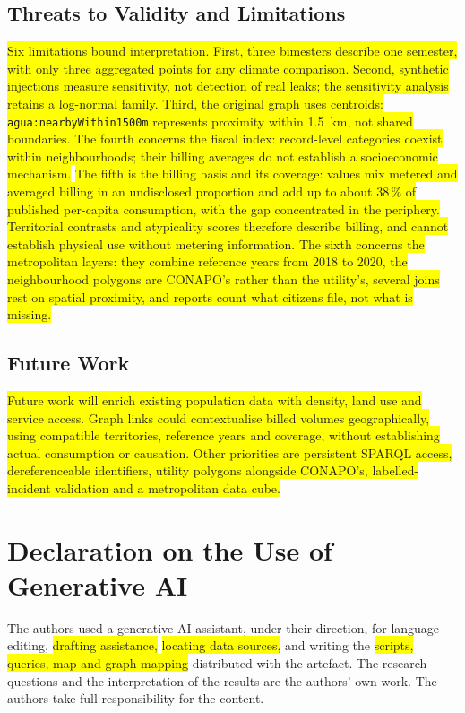 \documentclass[runningheads]{llncs}
\newif\ifmarcarcambios
\newenvironment{icokgblock}{\ifmarcarcambios\color{nuevo}\fi}{}
\newcommand{\nuevo}[1]{\colorbox{yellow}{#1}}
\renewcommand{\_}{\origunderscore\allowbreak}
\begin{document}
\begin{icokgblock}
\subsection{Threats to Validity and Limitations}

\nuevo{Six limitations bound interpretation. First, three bimesters describe one semester,
with only three aggregated points for any climate comparison. Second, synthetic
injections measure sensitivity, not detection of real leaks; the sensitivity analysis
retains a log-normal family. Third, the original graph uses centroids:
\texttt{agua:nearbyWithin1500m} represents proximity within 1.5~km, not shared boundaries.
The fourth concerns the fiscal index: record-level categories coexist within neighbourhoods;
their billing averages do not establish a socioeconomic mechanism.} \nuevo{The fifth is the billing basis and its coverage: values mix
metered and averaged billing in an undisclosed proportion and add up to about
38\,\% of published per-capita consumption, with the gap concentrated in the
periphery. Territorial contrasts and atypicality scores therefore describe billing,
and cannot establish physical use without metering information. The sixth concerns the metropolitan layers: they combine reference years from 2018 to 2020,
the neighbourhood polygons are CONAPO's rather than the utility's, several joins rest on spatial
proximity, and reports count what citizens file, not what is missing.}

\subsection{Future Work}

\nuevo{Future work will enrich existing population data with density, land use and service
access. Graph links could contextualise billed volumes geographically, using compatible
territories, reference years and coverage, without establishing actual consumption or
causation. Other priorities are persistent SPARQL access, dereferenceable identifiers,
utility polygons alongside CONAPO's, labelled-incident validation and a metropolitan
data cube.}
\end{icokgblock}

\begin{icokgblock}
\section*{Declaration on the Use of Generative AI}

The authors used a generative AI assistant, under their direction, for language
editing, \nuevo{drafting assistance,} \nuevo{locating data sources,} and writing the \nuevo{scripts, queries, map and graph mapping} distributed with the artefact. The
research questions and the interpretation of the results are the authors' own work.
The authors take full responsibility for the
content.
\end{icokgblock}
\end{document}
